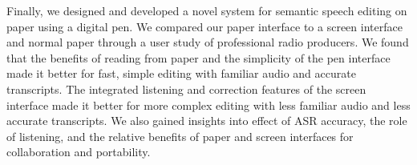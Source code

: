 Finally, we designed and developed a novel system for semantic speech editing on paper using a digital pen. We compared
our paper interface to a screen interface and normal paper through a user study of professional radio producers. We
found that the benefits of reading from paper and the simplicity of the pen interface made it better for fast, simple
editing with familiar audio and accurate transcripts.  The integrated listening and correction features of the screen
interface made it better for more complex editing with less familiar audio and less accurate transcripts.  We also
gained insights into effect of ASR accuracy, the role of listening, and the relative benefits of paper and screen
interfaces for collaboration and portability.


